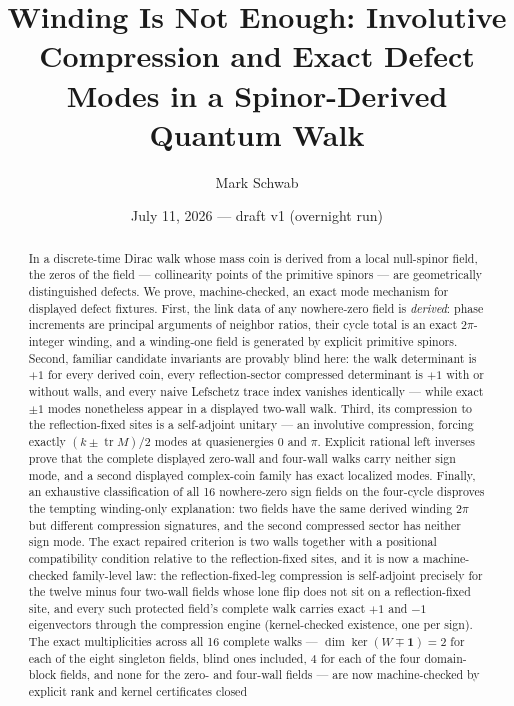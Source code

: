 \documentclass[11pt]{article}
\title{Winding Is Not Enough: Involutive Compression and Exact Defect
Modes in a Spinor-Derived Quantum Walk}
\author{Mark Schwab}
\date{July 11, 2026 --- draft v1 (overnight run)}
\newcommand{\id}{\mathbf{1}}
\newcommand{\tr}{\operatorname{tr}}
\begin{document}
\maketitle

\begin{abstract}
In a discrete-time Dirac walk whose mass coin is derived from a local
null-spinor field, the zeros of the field --- collinearity points of the
primitive spinors --- are geometrically distinguished defects.  We prove,
machine-checked, an exact mode mechanism for displayed defect fixtures.
First, the link data of any nowhere-zero field is \emph{derived}: phase
increments are principal arguments of neighbor ratios, their cycle total is
an exact $2\pi$-integer winding, and a winding-one field is generated by
explicit primitive spinors.  Second, familiar candidate invariants are
provably blind here: the walk determinant is $+1$ for every derived coin,
every reflection-sector compressed determinant is $+1$ with or without
walls, and every naive Lefschetz trace index vanishes identically ---
while exact $\pm1$ modes nonetheless appear in a displayed two-wall walk.
Third, its compression to the reflection-fixed sites is a self-adjoint
unitary --- an involutive compression, forcing exactly
$(k\pm\tr M)/2$ modes at quasienergies $0$ and $\pi$.  Explicit rational
left inverses prove that the complete displayed zero-wall and four-wall
walks carry neither sign mode, and a second displayed complex-coin family
has exact localized modes.  Finally, an exhaustive classification of all
16 nowhere-zero sign fields on the four-cycle disproves the tempting
winding-only explanation: two fields have the same derived winding $2\pi$
but different compression signatures, and the second compressed sector has
neither sign mode.  The exact repaired criterion is two walls together with
a positional compatibility condition relative to the reflection-fixed
sites, and it is now a machine-checked family-level law: the
reflection-fixed-leg compression is self-adjoint precisely for the twelve
minus four two-wall fields whose lone flip does not sit on a
reflection-fixed site, and every such protected field's complete walk
carries exact $+1$ and $-1$ eigenvectors through the compression engine
(kernel-checked existence, one per sign).  The exact multiplicities
across all 16 complete walks --- $\dim\ker(W\mp\id)=2$ for each of the
eight singleton fields, blind ones included, $4$ for each of the four
domain-block fields, and none for the zero- and four-wall fields --- are
now machine-checked by explicit rank and kernel certificates closed

\end{abstract}
\end{document}
